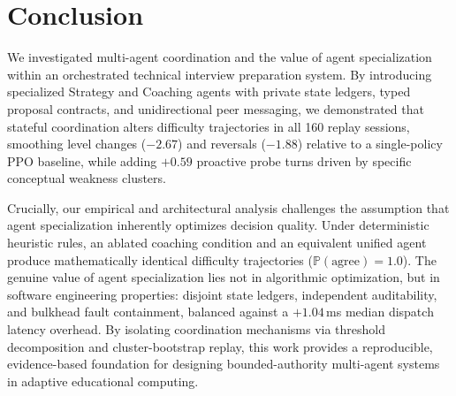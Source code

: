 \section{Conclusion}\label{sec:concl}
We investigated multi-agent coordination and the value of agent specialization within an orchestrated technical interview preparation system. By introducing specialized Strategy and Coaching agents with private state ledgers, typed proposal contracts, and unidirectional peer messaging, we demonstrated that stateful coordination alters difficulty trajectories in all 160 replay sessions, smoothing level changes ($-2.67$) and reversals ($-1.88$) relative to a single-policy PPO baseline, while adding $+0.59$ proactive probe turns driven by specific conceptual weakness clusters.

Crucially, our empirical and architectural analysis challenges the assumption that agent specialization inherently optimizes decision quality. Under deterministic heuristic rules, an ablated coaching condition and an equivalent unified agent produce mathematically identical difficulty trajectories ($\mathbb{P}(\text{agree}) = 1.0$). The genuine value of agent specialization lies not in algorithmic optimization, but in software engineering properties: disjoint state ledgers, independent auditability, and bulkhead fault containment, balanced against a $+1.04$\,ms median dispatch latency overhead. By isolating coordination mechanisms via threshold decomposition and cluster-bootstrap replay, this work provides a reproducible, evidence-based foundation for designing bounded-authority multi-agent systems in adaptive educational computing.
